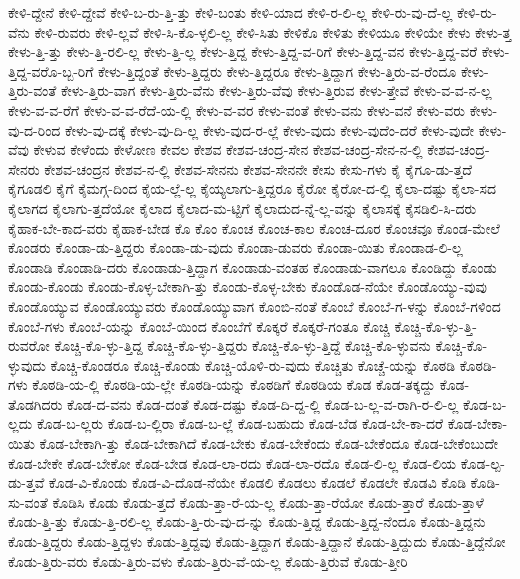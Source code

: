 {ಕೇಳಿ-ದ್ದೇನೆ
ಕೇಳಿ-ದ್ದೇವೆ
ಕೇಳಿ-ಬ-ರು-ತ್ತಿ-ತ್ತು
ಕೇಳಿ-ಬಂತು
ಕೇಳಿ-ಯಾದ
ಕೇಳಿ-ರ-ಲಿ-ಲ್ಲ
ಕೇಳಿ-ರು-ವು-ದೆ-ಲ್ಲ
ಕೇಳಿ-ರು-ವೆನು
ಕೇಳಿ-ರುವರು
ಕೇಳಿ-ಲ್ಲವೆ
ಕೇಳಿ-ಸಿ-ಕೊ-ಳ್ಳಲಿ-ಲ್ಲ
ಕೇಳಿ-ಸಿತು
ಕೇಳಿಕೊ
ಕೇಳಿತು
ಕೇಳಿಯೂ
ಕೇಳಿಯೇ
ಕೇಳು
ಕೇಳು-ತ್ತ
ಕೇಳು-ತ್ತಿ-ತ್ತು
ಕೇಳು-ತ್ತಿ-ರಲಿ-ಲ್ಲ
ಕೇಳು-ತ್ತಿ-ಲ್ಲ
ಕೇಳು-ತ್ತಿದ್ದ
ಕೇಳು-ತ್ತಿದ್ದ-ವ-ರಿಗೆ
ಕೇಳು-ತ್ತಿದ್ದ-ವನ
ಕೇಳು-ತ್ತಿದ್ದ-ವರೆ
ಕೇಳು-ತ್ತಿದ್ದ-ವರೊ-ಬ್ಬ-ರಿಗೆ
ಕೇಳು-ತ್ತಿದ್ದಂತೆ
ಕೇಳು-ತ್ತಿದ್ದರು
ಕೇಳು-ತ್ತಿದ್ದರೂ
ಕೇಳು-ತ್ತಿದ್ದಾಗ
ಕೇಳು-ತ್ತಿರು-ವ-ರೆಂದೂ
ಕೇಳು-ತ್ತಿರು-ವಂತೆ
ಕೇಳು-ತ್ತಿರು-ವಾಗ
ಕೇಳು-ತ್ತಿರು-ವೆನು
ಕೇಳು-ತ್ತಿರು-ವೆವು
ಕೇಳು-ತ್ತಿರುವ
ಕೇಳು-ತ್ತೇವೆ
ಕೇಳು-ವ-ವ-ನ-ಲ್ಲ
ಕೇಳು-ವ-ವ-ರೆಗೆ
ಕೇಳು-ವ-ವ-ರೆದೆ-ಯ-ಲ್ಲಿ
ಕೇಳು-ವ-ವರ
ಕೇಳು-ವಂತೆ
ಕೇಳು-ವನು
ಕೇಳು-ವನೆ
ಕೇಳು-ವರು
ಕೇಳು-ವು-ದ-ರಿಂದ
ಕೇಳು-ವು-ದಕ್ಕೆ
ಕೇಳು-ವು-ದಿ-ಲ್ಲ
ಕೇಳು-ವುದ-ರ-ಲ್ಲೆ
ಕೇಳು-ವುದು
ಕೇಳು-ವುದೆಂ-ದರೆ
ಕೇಳು-ವುದೇ
ಕೇಳು-ವೆವು
ಕೇಳುವ
ಕೇಳೆಂದು
ಕೇಳೋಣ
ಕೇವಲ
ಕೇಶವ
ಕೇಶವ-ಚಂದ್ರ-ಸೇನ
ಕೇಶವ-ಚಂದ್ರ-ಸೇನ-ನ-ಲ್ಲಿ
ಕೇಶವ-ಚಂದ್ರ-ಸೇನರು
ಕೇಶವ-ಚಂದ್ರನ
ಕೇಶವ-ನ-ಲ್ಲಿ
ಕೇಶವ-ಸೇನನು
ಕೇಶವ-ಸೇನನೇ
ಕೇಸು
ಕೇಸು-ಗಳು
ಕೈ
ಕೈಗೂ-ಡು-ತ್ತದೆ
ಕೈಗೂಡಲಿ
ಕೈಗೆ
ಕೈಮಗ್ಗ-ದಿಂದ
ಕೈಯ-ಲ್ಲೆ-ಲ್ಲ
ಕೈಯ್ಯಲಾಗು-ತ್ತಿದ್ದರೂ
ಕೈರೋ
ಕೈರೋ-ದ-ಲ್ಲಿ
ಕೈಲಾ-ದಷ್ಟು
ಕೈಲಾ-ಸದ
ಕೈಲಾಗದ
ಕೈಲಾಗು-ತ್ತದೆಯೋ
ಕೈಲಾದ
ಕೈಲಾದ-ಮ-ಟ್ಟಿಗೆ
ಕೈಲಾದುದ-ನ್ನೆ-ಲ್ಲ-ವನ್ನು
ಕೈಲಾಸಕ್ಕೆ
ಕೈಸಡಿಲಿ-ಸಿ-ದರು
ಕೈಹಾಕ-ಬೇ-ಕಾದ-ವರು
ಕೈಹಾಕ-ಬೇಡ
ಕೊ
ಕೊಂ
ಕೊಂಚ
ಕೊಂಚ-ಕಾಲ
ಕೊಂಚ-ದೂರ
ಕೊಂಚವೂ
ಕೊಂಡ-ಮೇಲೆ
ಕೊಂಡರು
ಕೊಂಡಾ-ಡು-ತ್ತಿದ್ದರು
ಕೊಂಡಾ-ಡು-ವುದು
ಕೊಂಡಾ-ಡುವರು
ಕೊಂಡಾ-ಯಿತು
ಕೊಂಡಾಡ-ಲಿ-ಲ್ಲ
ಕೊಂಡಾಡಿ
ಕೊಂಡಾಡಿ-ದರು
ಕೊಂಡಾಡು-ತ್ತಿದ್ದಾಗ
ಕೊಂಡಾಡು-ವಂತಹ
ಕೊಂಡಾಡು-ವಾಗಲೂ
ಕೊಂಡಿದ್ದು
ಕೊಂಡು
ಕೊಂಡು-ಕೊಂಡು
ಕೊಂಡು-ಕೊಳ್ಳ-ಬೇಕಾಗಿ-ತ್ತು
ಕೊಂಡು-ಕೊಳ್ಳ-ಬೇಕು
ಕೊಂಡೊಡ-ನೆಯೇ
ಕೊಂಡೊಯ್ಯು-ವುವು
ಕೊಂಡೊಯ್ಯುವ
ಕೊಂಡೊಯ್ಯುವರು
ಕೊಂಡೊಯ್ಯುವಾಗ
ಕೊಂಬಿ-ನಂತೆ
ಕೊಂಬೆ
ಕೊಂಬೆ-ಗ-ಳನ್ನು
ಕೊಂಬೆ-ಗಳಿಂದ
ಕೊಂಬೆ-ಗಳು
ಕೊಂಬೆ-ಯನ್ನು
ಕೊಂಬೆ-ಯಿಂದ
ಕೊಂಬೆಗೆ
ಕೊಕ್ಕರೆ
ಕೊಕ್ಕರೆ-ಗಂತೂ
ಕೊಚ್ಚಿ
ಕೊಚ್ಚಿ-ಕೊ-ಳ್ಳು-ತ್ತಿ-ರುವರೋ
ಕೊಚ್ಚಿ-ಕೊ-ಳ್ಳು-ತ್ತಿದ್ದ
ಕೊಚ್ಚಿ-ಕೊ-ಳ್ಳು-ತ್ತಿದ್ದರು
ಕೊಚ್ಚಿ-ಕೊ-ಳ್ಳು-ತ್ತಿದ್ದೆ
ಕೊಚ್ಚಿ-ಕೊ-ಳ್ಳುವನು
ಕೊಚ್ಚಿ-ಕೊ-ಳ್ಳುವುದು
ಕೊಚ್ಚಿ-ಕೊಂಡರೂ
ಕೊಚ್ಚಿ-ಕೊಂಡು
ಕೊಚ್ಚಿ-ಯೊಳಿ-ರು-ವುದು
ಕೊಚ್ಚಿತು
ಕೊಚ್ಚೆ-ಯನ್ನು
ಕೊಠಡಿ
ಕೊಠಡಿ-ಗಳು
ಕೊಠಡಿ-ಯ-ಲ್ಲಿ
ಕೊಠಡಿ-ಯ-ಲ್ಲೇ
ಕೊಠಡಿ-ಯನ್ನು
ಕೊಠಡಿಗೆ
ಕೊಠಡಿಯ
ಕೊಡ
ಕೊಡ-ತಕ್ಕದ್ದು
ಕೊಡ-ತೊಡಗಿದರು
ಕೊಡ-ದ-ವನು
ಕೊಡ-ದಂತೆ
ಕೊಡ-ದಷ್ಟು
ಕೊಡ-ದಿ-ದ್ದ-ಲ್ಲಿ
ಕೊಡ-ಬ-ಲ್ಲ-ವ-ರಾಗಿ-ರ-ಲಿ-ಲ್ಲ
ಕೊಡ-ಬ-ಲ್ಲದು
ಕೊಡ-ಬ-ಲ್ಲರು
ಕೊಡ-ಬ-ಲ್ಲಿರಾ
ಕೊಡ-ಬ-ಲ್ಲೆ
ಕೊಡ-ಬಹುದು
ಕೊಡ-ಬೆಡ
ಕೊಡ-ಬೇ-ಕಾ-ದರೆ
ಕೊಡ-ಬೇಕಾ-ಯಿತು
ಕೊಡ-ಬೇಕಾಗಿ-ತ್ತು
ಕೊಡ-ಬೇಕಾಗಿದೆ
ಕೊಡ-ಬೇಕು
ಕೊಡ-ಬೇಕೆಂದು
ಕೊಡ-ಬೇಕೆಂದೂ
ಕೊಡ-ಬೇಕೆಂಬುದೇ
ಕೊಡ-ಬೇಕೇ
ಕೊಡ-ಬೇಕೋ
ಕೊಡ-ಬೇಡ
ಕೊಡ-ಲಾ-ರದು
ಕೊಡ-ಲಾ-ರದೊ
ಕೊಡ-ಲಿ-ಲ್ಲ
ಕೊಡ-ಲಿಯ
ಕೊಡ-ಲ್ಪ-ಡು-ತ್ತವೆ
ಕೊಡ-ವಿ-ಕೊಂಡು
ಕೊಡ-ವಿ-ದೊಡ-ನೆಯೇ
ಕೊಡಲಿ
ಕೊಡಲು
ಕೊಡಲೆ
ಕೊಡಲೇ
ಕೊಡವಿ
ಕೊಡಿ
ಕೊಡಿ-ಸು-ವಂತೆ
ಕೊಡಿಸಿ
ಕೊಡು
ಕೊಡು-ತ್ತದೆ
ಕೊಡು-ತ್ತಾ-ರೆ-ಯ-ಲ್ಲ
ಕೊಡು-ತ್ತಾ-ರೆಯೋ
ಕೊಡು-ತ್ತಾರೆ
ಕೊಡು-ತ್ತಾಳೆ
ಕೊಡು-ತ್ತಿ-ತ್ತು
ಕೊಡು-ತ್ತಿ-ರಲಿ-ಲ್ಲ
ಕೊಡು-ತ್ತಿ-ರು-ವು-ದ-ನ್ನು
ಕೊಡು-ತ್ತಿದ್ದ
ಕೊಡು-ತ್ತಿದ್ದ-ನೆಂದೂ
ಕೊಡು-ತ್ತಿದ್ದನು
ಕೊಡು-ತ್ತಿದ್ದರು
ಕೊಡು-ತ್ತಿದ್ದಳು
ಕೊಡು-ತ್ತಿದ್ದವು
ಕೊಡು-ತ್ತಿದ್ದಾಗ
ಕೊಡು-ತ್ತಿದ್ದಾನೆ
ಕೊಡು-ತ್ತಿದ್ದುದು
ಕೊಡು-ತ್ತಿದ್ದೆನೋ
ಕೊಡು-ತ್ತಿರು-ವರು
ಕೊಡು-ತ್ತಿರು-ವಳು
ಕೊಡು-ತ್ತಿರು-ವೆ-ಯ-ಲ್ಲ
ಕೊಡು-ತ್ತಿರುವೆ
ಕೊಡು-ತ್ತೀರಿ
}
